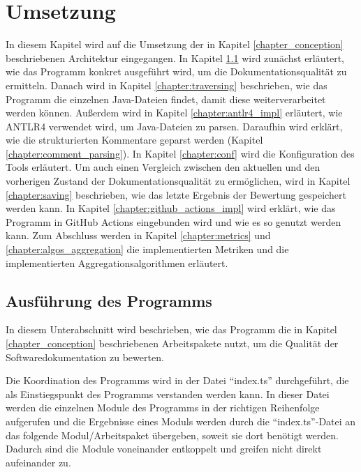 
\begingroup
\renewcommand{\cleardoublepage}{} %
\renewcommand{\clearpage}{}
\chapter{Umsetzung}\label{chapter:program}
\endgroup
In diesem Kapitel wird auf die Umsetzung der in Kapitel \ref{chapter_conception} beschriebenen Architektur eingegangen. In Kapitel \ref{chapter:tool_running} wird zunächst erläutert, wie das Programm konkret ausgeführt wird, um die Dokumentationsqualität zu ermitteln. Danach wird in Kapitel \ref{chapter:traversing} beschrieben, wie das Programm die einzelnen Java-Dateien findet, damit diese weiterverarbeitet werden können.  Außerdem wird in Kapitel \ref{chapter:antlr4_impl} erläutert, wie ANTLR4 verwendet wird, um Java-Dateien zu parsen. Daraufhin wird erklärt, wie die strukturierten Kommentare geparst werden (Kapitel \ref{chapter:comment_parsing}).  In Kapitel \ref{chapter:conf} wird die Konfiguration des Tools erläutert. Um auch einen Vergleich zwischen den aktuellen und den vorherigen Zustand der Dokumentationsqualität zu ermöglichen, wird in Kapitel \ref{chapter:saving} beschrieben, wie das letzte Ergebnis der Bewertung gespeichert werden kann. In Kapitel \ref{chapter:github_actions_impl} wird erklärt, wie das Programm in GitHub Actions eingebunden wird und wie es so genutzt werden kann. Zum Abschluss werden in Kapitel \ref{chapter:metrics} und \ref{chapter:algos_aggregation} die implementierten Metriken und die implementierten Aggregationsalgorithmen erläutert. 


\hfill
\section{Ausführung des Programms}\label{chapter:tool_running}
In diesem Unterabschnitt wird beschrieben, wie das Programm die in Kapitel \ref{chapter_conception}
beschriebenen Arbeitspakete nutzt, um die Qualität der Softwaredokumentation zu bewerten. 

Die Koordination des Programms wird in der Datei \enquote{index.ts} durchgeführt, die als Einstiegspunkt des Programms verstanden werden kann. In dieser Datei werden die einzelnen Module des Programms in der richtigen Reihenfolge aufgerufen und die Ergebnisse eines Moduls werden durch die \enquote{index.ts}-Datei an das folgende Modul/Arbeitspaket übergeben, soweit sie dort benötigt werden. Dadurch sind die Module voneinander entkoppelt und greifen nicht direkt aufeinander zu. 

